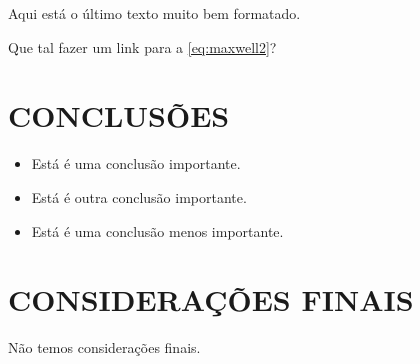 Aqui está o último texto muito bem formatado. \blindtext[2]

Que tal fazer um link para a \autoref{eq:maxwell2}?

\section{CONCLUSÕES}

\begin{itemize}
  \item Está é uma conclusão importante.
  \item Está é outra conclusão importante.
  \item Está é uma conclusão menos importante.
\end{itemize}


\section{CONSIDERAÇÕES FINAIS}

Não temos considerações finais.
